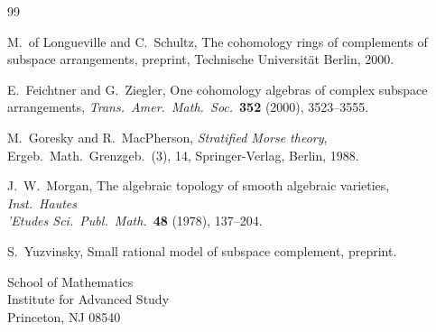 \documentclass[11pt,a4paper]{article}
\theoremstyle{plain}
\theoremstyle{definition}
\begin{document}
\begin{thebibliography}{99}

M.~of Longueville and C.~Schultz, The cohomology rings of complements of subspace arrangements, preprint, Technische Universit\"at Berlin, 2000.

E.~Feichtner and G.~Ziegler, One cohomology algebras of complex subspace arrangements, \textit{Trans.\ Amer.\ Math.\ Soc.}\ \textbf{352} (2000), 3523--3555.

M.~Goresky and R.~MacPherson, \textit{Stratified Morse theory}, Ergeb.\ Math.\ Grenzgeb.\ (3), 14, Springer-Verlag, Berlin, 1988.

J.~W.~Morgan, The algebraic topology of smooth algebraic varieties, \textit{Inst.\ Hautes \\'Etudes Sci.\ Publ.\ Math.}\ \textbf{48} (1978), 137--204.

S.~Yuzvinsky, Small rational model of subspace complement, preprint.

\end{thebibliography}

\vspace{12pt}
\noindent
School of Mathematics\\
Institute for Advanced Study\\
Princeton, NJ 08540
\end{document}
